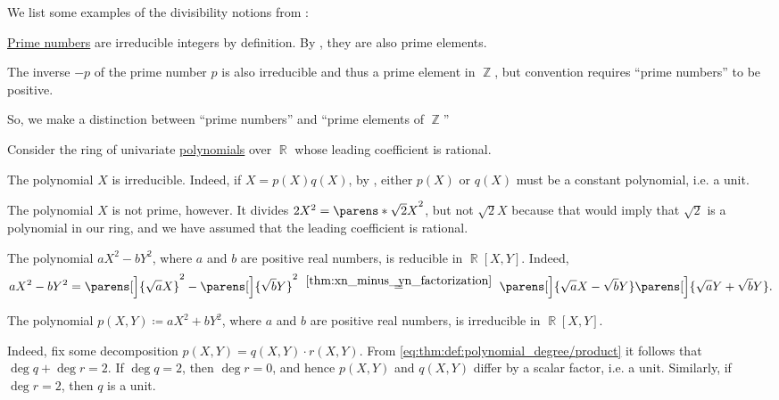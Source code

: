 \begin{example}\label{ex:def:domain_divisibility}
  We list some examples of the divisibility notions from :
  \begin{thmenum}
     \hyperref[def:prime_number]{Prime numbers} are irreducible integers by definition. By , they are also prime elements.

    The inverse \( -p \) of the prime number \( p \) is also irreducible and thus a prime element in \( \BbbZ \), but convention requires \enquote{prime numbers} to be positive.

    So, we make a distinction between \enquote{prime numbers} and \enquote{prime elements of \( \BbbZ \)}

     Consider the ring of univariate \hyperref[def:polynomial_algebra]{polynomials} over \( \BbbR \) whose leading coefficient is rational.

    The polynomial \( X \) is irreducible. Indeed, if \( X = p(X) q(X) \), by , either \( p(X) \) or \( q(X) \) must be a constant polynomial, i.e. a unit.

    The polynomial \( X \) is not prime, however. It divides \( 2X^2 = \parens*{ \sqrt 2 X }^2 \), but not \( \sqrt 2 X \) because that would imply that \( \sqrt 2 \) is a polynomial in our ring, and we have assumed that the leading coefficient is rational.

     The polynomial \( a X^2 - b Y^2 \), where \( a \) and \( b \) are positive real numbers, is reducible in \( \BbbR[X, Y] \). Indeed,
    \begin{equation*}
      a X^2 - b Y^2
      =
      \parens[\Big]{ \sqrt a X }^2 - \parens[\Big]{ \sqrt b Y }^2
      \reloset {\ref{thm:xn_minus_yn_factorization}} =
      \parens[\Big]{ \sqrt a X - \sqrt b Y } \parens[\Big]{ \sqrt a Y + \sqrt b Y }.
    \end{equation*}

     The polynomial \( p(X, Y) \coloneqq a X^2 + b Y^2 \), where \( a \) and \( b \) are positive real numbers, is irreducible in \( \BbbR[X, Y] \).

    Indeed, fix some decomposition \( p(X, Y) = q(X, Y) \cdot r(X, Y) \). From \eqref{eq:thm:def:polynomial_degree/product} it follows that \( \deg q + \deg r = 2 \). If \( \deg q = 2 \), then \( \deg r = 0 \), and hence \( p(X, Y) \) and \( q(X, Y) \) differ by a scalar factor, i.e. a unit. Similarly, if \( \deg r = 2 \), then \( q \) is a unit.


\end{thmenum}
\end{example}
